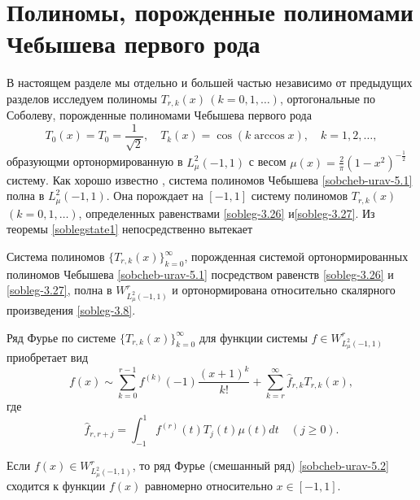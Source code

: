 \section{Полиномы, порожденные полиномами Чебышева первого рода}
В настоящем разделе мы отдельно и большей частью независимо от предыдущих разделов исследуем полиномы $T_{r,k}(x)\,(k=0,1,\ldots)$, ортогональные по Соболеву, порожденные полиномами Чебышева первого рода
\begin{equation}\label{sobcheb-urav-5.1}
T_0(x)=T_0=\frac{1}{\sqrt{2}},\quad T_k(x)=\cos(k\arccos x), \quad k=1,2,\ldots,
\end{equation}
образующми  ортонормированную  в $L_\mu^2(-1,1)$ с весом  $\mu(x)=\frac2\pi(1-x^2)^{-\frac12}$ систему. Как хорошо известно \cite{laplas-Sege}, система полиномов Чебышева \eqref{sobcheb-urav-5.1} полна в $L_\mu^2(-1,1)$.   Она порождает на $[-1,1]$ систему полиномов $T_{r,k}(x)$ $(k=0,1,\ldots)$, определенных равенствами \eqref{sobleg-3.26} и\eqref{sobleg-3.27}.
Из теоремы \ref{soblegstate1} непосредственно вытекает
\begin{corollary}
  Система полиномов $\{T_{r,k}(x)\}_{k=0}^\infty$, порожденная системой ортонормированных полиномов Чебышева \eqref{sobcheb-urav-5.1} посредством равенств \eqref{sobleg-3.26} и \eqref{sobleg-3.27}, полна  в $W^r_{L^2_\mu(-1,1)}$ и ортонормирована относительно скалярного произведения \eqref{sobleg-3.8}.
\end{corollary}

Ряд Фурье по системе $\{T_{r,k}(x)\}_{k=0}^\infty$ для функции системы   $f\in W^r_{L^2_\mu(-1,1)}$ приобретает вид
\begin{equation}\label{sobcheb-urav-5.2}
f(x)\sim \sum_{k=0}^{r-1} f^{(k)}(-1)\frac{(x+1)^k}{k!}+ \sum_{k=r}^\infty \hat f_{r,k}T_{r,k}(x),
\end{equation}
где
  \begin{equation}\label{sobcheb-urav-5.3}
 \hat f_{r,r+j}=\int_{-1}^1 f^{(r)}(t)T_{j}(t)\mu(t)dt\quad(j\ge0).
\end{equation}

\begin{corollary}
 Если $f(x)\in W^r_{L^2_\mu(-1,1)}$, то ряд Фурье (смешанный ряд) \eqref{sobcheb-urav-5.2} сходится к функции $f(x)$ равномерно относительно $x\in[-1,1]$.
\end{corollary}

